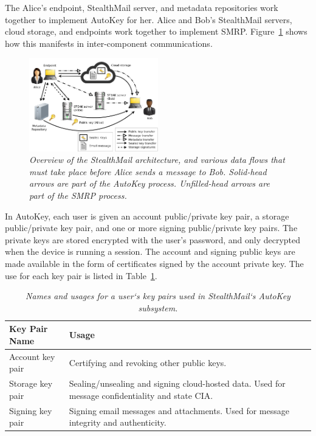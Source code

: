 The Alice’s endpoint, StealthMail server, and metadata repositories work together to implement AutoKey for her.  Alice and Bob’s StealthMail servers, cloud storage, and endpoints work together to implement SMRP.  Figure~\ref{fig:overview} shows how this manifests in inter-component communications.

\begin{figure}[h!]
\centering
\includegraphics[width=0.5\textwidth]{figures/overview}
\caption{\it Overview of the StealthMail architecture, and various data flows that must take place before Alice sends a message to Bob.  Solid-head arrows are part of the AutoKey process.  Unfilled-head arrows are part of the SMRP process.}
\label{fig:overview}
\end{figure}


In AutoKey, each user is given an account public/private key pair, a storage public/private key pair, and one or more signing public/private key pairs.  The private keys are stored encrypted with the user’s password, and only decrypted when the device is running a session.  The account and signing public keys are made available in the form of certificates signed by the account private key.  The use for each key pair is listed in Table~\ref{tab:keypairs}.

\begin{table}[ht!]
\begin{tabular}{ | l | p{14cm} |}
\hline
\textbf{Key Pair Name} & \textbf{Usage} \\
\hline
Account key pair & Certifying and revoking other public keys. \\
Storage key pair & Sealing/unsealing and signing cloud-hosted data.  Used for message confidentiality and state CIA. \\
Signing key pair & Signing email messages and attachments.  Used for message integrity and authenticity. \\
\hline
\end{tabular}
\caption{\it Names and usages for a user`s key pairs used in StealthMail`s AutoKey subsystem.}
\label{tab:keypairs}
\end{table}


